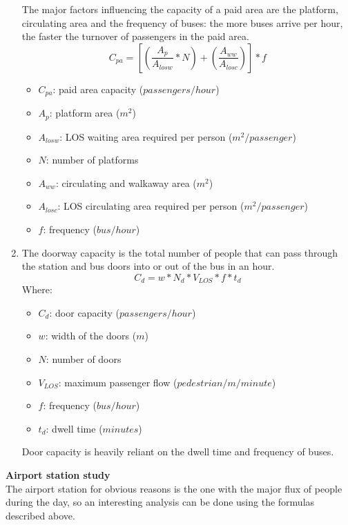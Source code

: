 \documentclass{article}
\begin{document}
\begin{enumerate}
The major factors influencing the capacity of a paid area are the platform, circulating area and the frequency of buses: the more buses arrive per hour, the faster the turnover of passengers in the paid area. 
\begin{equation}
C_{pa}=\left[\left(\frac{A_{p}}{A_{losw}}*N\right)+\left(\frac{A_{ww}}{A_{losc}}\right)\right]*f
\end{equation}
\begin{itemize}
\item $C_{pa}$: paid area capacity ($passengers/ hour$) 
\item $A_p$: platform area ($m^2$)
\item $A_{losw}$: LOS waiting area required per person ($m^2/passenger$)
\item $N$: number of platforms
\item $A_{ww}$: circulating and walkaway area ($m^2$)
\item $A_{losc}$: LOS circulating area required per person  ($m^2/passenger$)
\item $f$: frequency ($bus/hour$)
\end{itemize}
\item The doorway capacity is the total number of people that can pass through the station and bus doors into or out of the bus in an hour. 
\begin{equation}
C_d=w*N_d*V_{LOS}*f*t_{d}
\end{equation}
Where:
\begin{itemize}
 \item $C_{d}$: door capacity ($passengers/ hour$) 
\item $w$: width of the doors ($m$)
\item $N$: number of doors
\item $V_{LOS}$: maximum passenger flow ($pedestrian/m/minute$)
\item $f$: frequency ($bus/hour$)
\item $t_d$: dwell time ($minutes$)
\end{itemize}
Door capacity is heavily reliant on the dwell time and frequency of buses.  
\end{enumerate}
\textbf{Airport station study}\\
The airport station for obvious reasons is the one with the major flux of people during the day, so an interesting analysis can be done using the formulas described above. 
\end{document}
